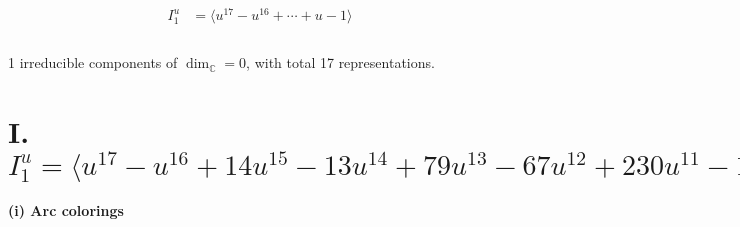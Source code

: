 \documentclass[1p]{elsarticle_modified}
\theoremstyle{definition}
\begin{document}
\begin{align*}
I^u_{1}&=\langle 
u^{17}- u^{16}+\cdots+u-1\rangle \\
\\
\end{align*}
\raggedright * 1 irreducible components of $\dim_{\mathbb{C}}=0$, with total 17 representations.\\
\newpage
\renewcommand{\arraystretch}{1}
\centering \section*{I. $I^u_{1}= \langle u^{17}- u^{16}+14 u^{15}-13 u^{14}+79 u^{13}-67 u^{12}+230 u^{11}-174 u^{10}+367 u^9-239 u^8+314 u^7-166 u^6+130 u^5-50 u^4+20 u^3-4 u^2+u-1 \rangle$}
\flushleft \textbf{(i) Arc colorings}\\
\end{document}
